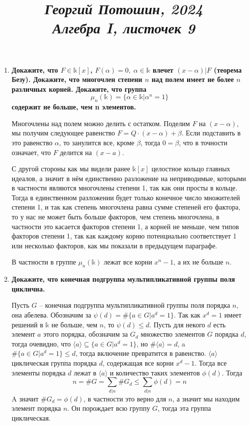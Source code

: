\documentclass{article}
\title{
\textit{\small{Георгий Потошин, 2024}}\\
\vspace{0.3ex}
\textit{\huge{Алгебра I, листочек 9}}\vspace{1ex}
}
\date{\vspace{-10ex}}
\begin{document}
\maketitle

\begin{enumerate}
    \item \textbf{Докажите, что $F\in\mathbb{k}[x]$, $F(\alpha)=0,\;\alpha\in\mathbb{k}$ влечет
        $(x−\alpha)|F$ (теорема Безу). Докажите, что многочлен степени $n$ над полем имеет не
        более $n$ различных корней. Докажите, что группа
        \[\mu_n(\mathbb{k})=\{\alpha\in\mathbb{k}|\alpha^n=1\}\]
        содержит не больше, чем n элементов.}

        Многочлены над полем можно делить с остатком. Поделим $F$ на $(x-\alpha)$,
        мы получим следующее равенство $F=Q\cdot(x-\alpha)+\beta$. Если подставить
        в это равенство $\alpha$, то занулится все, кроме $\beta$, тогда $0=\beta$,
        что в точности означает, что $F$ делится на $(x-a)$.

        С другой стороны как мы видели ранее $\mathbb{k}[x]$ целостное кольцо
        главных идеалов, а значит в нём единственно разложение на неприводимые, которыми
        в частности являются многочлены степени 1, так как они просты в кольце.
        Тогда в единственном разложении будет только конечное число множителей
        степени 1, и так как степень многочлена равна сумме степеней его фактора,
        то у нас не может быть больше факторов, чем степень многочлена, в частности
        это касается факторов степени 1, а корней не меньше, чем типов факторов
        степени 1, так как каждому корню потенциально соответствует 1 или несколько
        факторов, как мы показали в предыдущем параграфе.
        
        В частности в группе $\mu_n(\mathbb{k})$ лежат все корни $x^n-1$, а их
        не больше $n$.

    \item \textbf{Докажите, что конечная подгруппа мультипликативной группы поля циклична.}

        Пусть $G$ – конечная подгруппа мультипликативной группы поля порядка $n$, она абелева. Обозначим за
        $\psi(d) = \#\{a\in G | a^d = 1\}$. Так как $x^d=1$ имеет решений в $\mathbb{k}$
        не больше, чем $n$, то $\psi(d)\leq d$. Пусть для некого $d$ есть элемент $a$ этого
        порядка, обозначим за $G_d$ множество элементов $G$ порядка $d$, тогда очевидно, что
        $\langle a\rangle\subseteq\{a\in G | a^d=1\}$, но $\#\langle a\rangle = d$,
        a $\#\{a\in G | a^d = 1\}\leq d$, тогда включение превратится в равенство.
        $\langle a\rangle$ циклическая группа порядка $d$, содержащая все корни
        $x^d-1$. Тогда все элементы порядка $d$ лежат в $\langle a\rangle$ и количество
        таких элементов $\phi(d)$. Тогда
        \[n=\#G=\sum_{d|n}\#G_d\leq\sum_{d|n}\phi(d)=n\]
        A значит $\#G_d=\phi(d)$, в частности это верно для $n$, а значит мы находим элемент порядка $n$.
        Он порождает всю группу $G$, тогда эта группа циклическая.
        

\end{enumerate}
\end{document}
